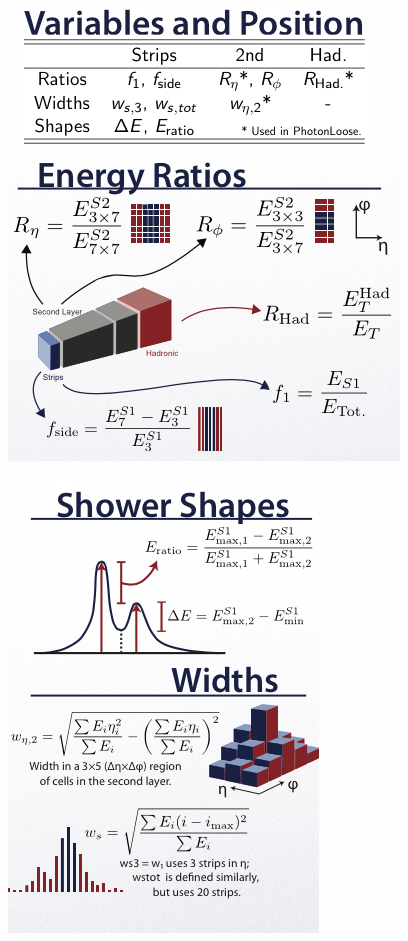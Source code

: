 \documentclass[10pt, compress,spanish]{beamer}
\begin{document}
\begin{frame}[fragile]
\begin{columns}
\begin{column}{0.3\textwidth}
\begin{figure}
\includegraphics[scale=0.28]{EM_Showers1.png}
\end{figure}
\vspace{-1.2cm}
\begin{figure}
\includegraphics[scale=0.3]{EM_Showers2.png}
\end{figure}
\end{column}



\end{columns}





\end{frame}
\end{document}
